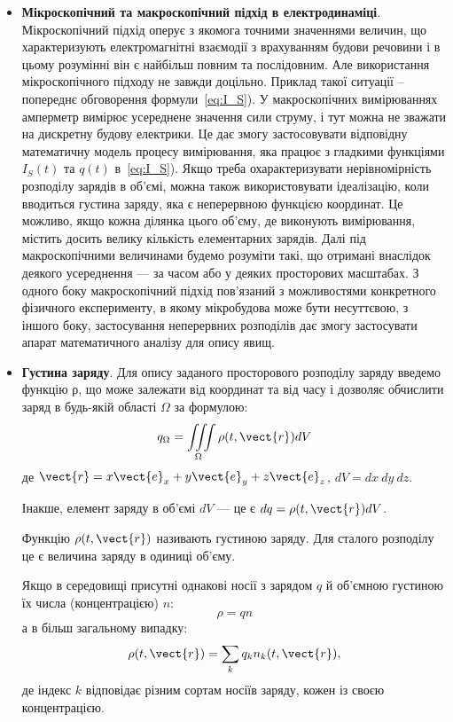 \begin{itemize}
\item \textbf{Мікроскопічний та макроскопічний підхід в електродинаміці}. Мікроскопічний підхід оперує з якомога точними значеннями величин, що
характеризують електромагнітні взаємодії з врахуванням будови речовини і в цьому
розумінні він є найбільш повним та послідовним. Але використання мікроскопічного підходу не завжди доцільно. Приклад такої ситуації – попереднє
обговорення формули~\eqref{eq:I_S}). У макроскопічних вимірюваннях амперметр вимірює усереднене значення сили струму, і тут можна не зважати на
дискретну будову електрики. Це дає змогу застосовувати відповідну математичну модель процесу вимірювання, яка працює з гладкими функціями $I_S(t)$ та
$q(t)$ в~\eqref{eq:I_S}). Якщо треба охарактеризувати нерівномірність розподілу зарядів в об’ємі, можна також використовувати ідеалізацію, коли
вводиться густина заряду, яка є неперервною функцією координат. Це можливо, якщо кожна ділянка цього об’єму, де виконують вимірювання, містить досить
велику кількість елементарних зарядів. Далі під макроскопічними величинами будемо розуміти такі, що отримані внаслідок деякого усереднення --- за часом
або у деяких просторових масштабах. З одного боку макроскопічний підхід пов’язаний з можливостями конкретного фізичного експерименту, в якому
мікробудова може бути несуттєвою, з іншого боку, застосування неперервних розподілів дає змогу застосувати апарат математичного аналізу для опису явищ.


\item  \textbf{Густина заряду}. Для опису заданого просторового розподілу заряду
введемо функцію ρ, що може залежати від координат та від часу і дозволяє
обчислити заряд в будь-якій області $\Omega$ за формулою:
\begin{equation}\label{eq:q}
    q_{\Omega} = \iiint\limits_{\Omega} \rho(t, \vect{r}) dV
\end{equation}
де $\vect{r} = x\vect{e}_x + y\vect{e}_y + z\vect{e}_z$, $dV=dx\ dy\ dz$.

Інакше, елемент заряду в об’ємі $dV$ --- це є $dq = \rho(t, \vect{r}) dV$.

Функцію $\rho(t, \vect{r})$ називають густиною заряду. Для сталого розподілу це є
величина заряду в одиниці об’єму.

Якщо в середовищі присутні однакові носії з зарядом $q$ й об’ємною
густиною їх числа (концентрацією) $n$:
\begin{equation}
    \rho = qn
\end{equation}
а в більш загальному випадку:
\begin{equation}
    \rho(t, \vect{r}) = \sum\limits_k q_kn_k(t, \vect{r}),
\end{equation}
де індекс $k$ відповідає різним сортам носіїв заряду, кожен із своєю концентрацією.



\end{itemize}
